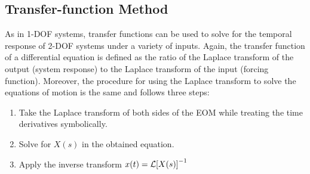 \documentclass[12pt,letter]{article}
\begin{document}
	
	
	
	
	
	
	
	
	\subsection{Transfer-function Method}
	
	As in 1-DOF systems, transfer functions can be used to solve for the temporal response of 2-DOF systems under a variety of inputs. Again, the transfer function of a differential equation is defined as the ratio of the Laplace transform of the output (system response) to the Laplace transform of the input (forcing function). Moreover, the procedure for using the Laplace transform to solve the equations of motion is the same and follows three steps:
	\begin{enumerate}
		\item Take the Laplace transform of both sides of the EOM while treating the time derivatives symbolically.
		\item Solve for $X(s)$ in the obtained equation.
		\item Apply the inverse transform $x(t) = \mathcal{L}{\left[X(s)\right]}^{-1}$
	\end{enumerate}
	
\end{document}
